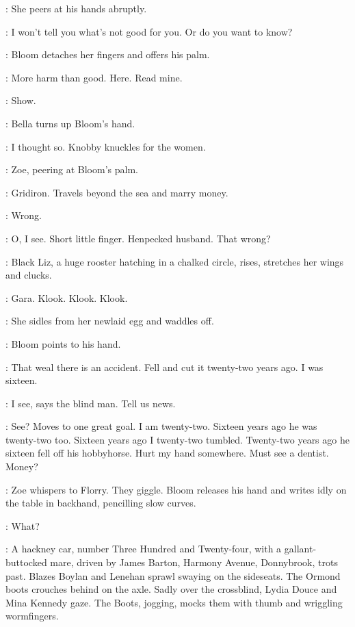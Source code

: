:
She peers at his hands abruptly.

\Zoe:
I won't tell you what's not good for you.
Or do you want to know?

:
Bloom detaches her fingers and offers his palm.

\Bloom:
More harm than good.
Here.
Read mine.

\Bella:
Show.

:
Bella turns up Bloom's hand.

\Bella:
I thought so.
Knobby knuckles for the women.

:
Zoe, peering at Bloom's palm.

\Zoe:
Gridiron.
Travels beyond the sea and marry money.

\Bloom:
Wrong.

\Zoe:
O, I see.
Short little finger.
Henpecked husband.
That wrong?

:
Black Liz, a huge rooster hatching in a chalked circle,
rises, stretches her wings and clucks.

\BlackLiz:
Gara.
Klook.
Klook.
Klook.

:
She sidles from her newlaid egg and waddles off.

:
Bloom points to his hand.

\Bloom:
That weal there is an accident.
Fell and cut it twenty-two years ago.
I was sixteen.

\Zoe:
I see, says the blind man.
Tell us news.

\Stephen:
See?
Moves to one great goal.
I am twenty-two.
Sixteen years ago he was twenty-two too.
Sixteen years ago I twenty-two tumbled.
Twenty-two years ago he sixteen fell off his hobbyhorse.
Hurt my hand somewhere.
Must see a dentist.
Money?

:
Zoe whispers to Florry.
They giggle.
Bloom releases his hand and writes idly
on the table in backhand, pencilling slow curves.

\Florry:
What?


:
A hackney car, number Three Hundred and Twenty-four,
with a gallant-butt\-ocked mare,
driven by James Barton, Harmony Avenue, Donnybrook, trots past.
Blazes Boylan and Lenehan sprawl swaying on the sideseats.
The Ormond boots crouches behind on the axle.
Sadly over the crossblind, Lydia Douce and Mina Kennedy gaze.
The Boots, jogging, mocks them with thumb and wriggling wormfingers.

